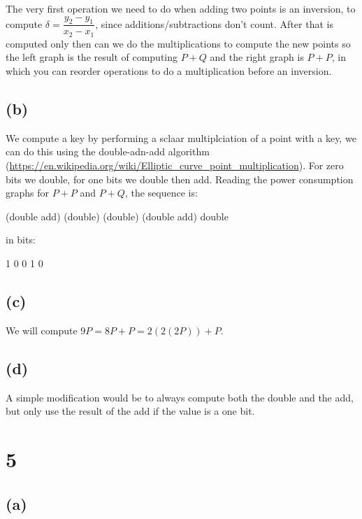 \documentclass[11pt]{article}
\begin{document}
The very first operation we need to do when adding two points is an inversion, to compute $\delta = \dfrac{y_2 - y_1}{x_2 - x_1}$, since additions/subtractions don't count. After that is computed only then can we do the multiplications to compute the new points so the left graph is the result of computing $P + Q$ and the right graph is $P + P$, in which you can reorder operations to do a multiplication before an inversion.

\subsection{(b)}

We compute a key by performing a sclaar multiplciation of a point with a key, we can do this using the double-adn-add algorithm (\url{https://en.wikipedia.org/wiki/Elliptic_curve_point_multiplication}). For zero bits we double, for one bits we double then add. Reading the power consumption graphs for $P + P$ and $P + Q$, the sequence is: 

(double add) (double) (double) (double add) double

in bits:

1 0 0 1 0

\subsection{(c)}

We will compute $9P = 8P + P = 2(2(2P)) + P$.


\subsection{(d)}

A simple modification would be to always compute both the double and the add, but only use the result of the add if the value is a one bit.

\newpage

\section{5}

\subsection{(a)}
\end{document}
